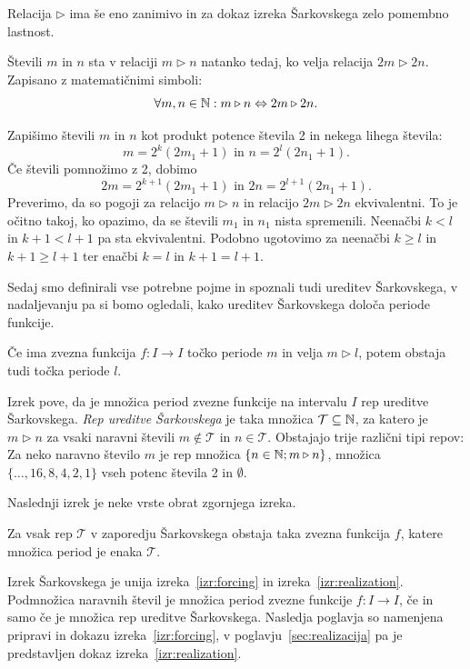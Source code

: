 \documentclass[../TG_magistrsko_delo_sections.tex]{subfiles}
\begin{document}
Relacija $\triangleright$ ima še eno zanimivo in za dokaz izreka Šarkovskega zelo pomembno lastnost.
\begin{trditev}\label{trd:doubling}
Števili $m$ in $n$ sta v relaciji $m \triangleright n$ natanko tedaj, ko velja relacija $2m \triangleright 2n$. Zapisano z matematičnimi simboli:
$$\forall m, n \in \mathbb N: m \triangleright n \Leftrightarrow 2m \triangleright 2n.$$
\end{trditev}
\begin{dokaz}
Zapišimo števili $m$ in $n$ kot produkt potence števila 2 in nekega lihega števila:
$$m= 2^k(2m_1 +1)\text{ in } n= 2^l(2n_1 +1).$$
Če števili pomnožimo z 2, dobimo
$$2m= 2^{k+1}(2m_1 +1)\text{ in } 2n= 2^{l+1}(2n_1 +1).$$
Preverimo, da so pogoji za relacijo $m \triangleright n$ in relacijo $2m \triangleright 2n$ ekvivalentni. To je očitno takoj, ko opazimo, da se števili $m_1$ in $n_1$ nista spremenili. Neenačbi $k<l$ in $k+1<l+1$ pa sta ekvivalentni. Podobno ugotovimo za neenačbi $k \geq l$ in $k+1 \geq l+1$ ter enačbi $k=l$ in $k+1 = l+1$.
\end{dokaz}

Sedaj smo definirali vse potrebne pojme in spoznali tudi ureditev Šarkovskega, v nadaljevanju pa si bomo ogledali, kako ureditev Šarkovskega določa periode funkcije.

\begin{izrek}\label{izr:forcing}
Če ima zvezna funkcija $f \colon I \to I$ točko periode $m$ in velja $ m \triangleright l$, potem obstaja tudi točka periode $l$.
\end{izrek}
Izrek pove, da je množica period zvezne funkcije na intervalu $I$ rep ureditve Šarkovskega. \emph{Rep ureditve Šarkovskega} je taka množica $\mathcal{T} \subseteq \mathbb N$, za katero je $m \triangleright n$ za  vsaki naravni števili $m \notin \mathcal{T}$ in $n \in \mathcal{T}$. Obstajajo trije različni tipi repov:  Za neko naravno število $m$ je rep množica $\{n \in \mathbb N; m \triangleright n\}$, množica $\{\dots, 16, 8, 4, 2, 1\}$ vseh potenc števila 2 in $\emptyset$.

Naslednji izrek je neke vrste obrat zgornjega izreka.

\begin{izrek}\label{izr:realization}
Za vsak rep $\mathcal{T}$ v zaporedju Šarkovskega obstaja taka zvezna funkcija $f$, katere množica period je enaka $\mathcal{T}$.
\end{izrek}

Izrek Šarkovskega je unija izreka~\ref{izr:forcing} in izreka~\ref{izr:realization}. Podmnožica naravnih števil je množica period zvezne funkcije $f \colon I \to I$, če in samo če je množica rep ureditve Šarkovskega. Nasledja poglavja so namenjena pripravi in dokazu izreka~\ref{izr:forcing}, v poglavju~\ref{sec:realizacija} pa je predstavljen dokaz izreka~\ref{izr:realization}.
\end{document}

